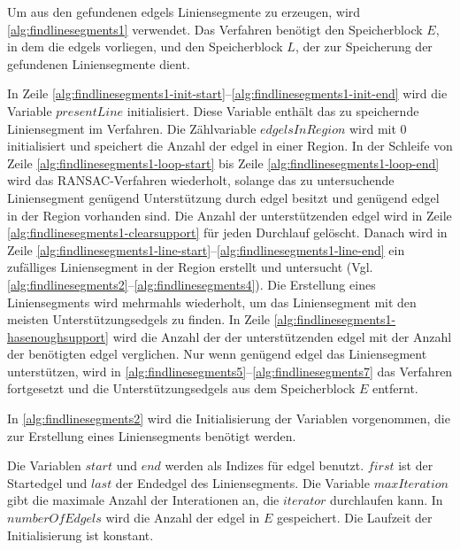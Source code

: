Um aus den gefundenen \glspl{edgel} Liniensegmente zu erzeugen, wird \autoref{alg:findlinesegments1} verwendet. Das
 Verfahren benötigt den Speicherblock $E$, in dem die \glspl{edgel} vorliegen, und den Speicherblock $L$, der zur
 Speicherung der gefundenen Liniensegmente dient.

In Zeile \ref{alg:findlinesegments1-init-start}--\ref{alg:findlinesegments1-init-end} wird die Variable
 $\mathit{presentLine}$ initialisiert. Diese Variable enthält das zu speichernde Liniensegment im Verfahren.
 Die Zählvariable $\mathit{edgelsInRegion}$ wird mit $0$ initialisiert und speichert die Anzahl der \gls{edgel} in
 einer Region. In der Schleife von Zeile \ref{alg:findlinesegments1-loop-start} bis Zeile
 \ref{alg:findlinesegments1-loop-end} wird das RANSAC-Verfahren wiederholt, solange das zu untersuchende Liniensegment
 genügend Unterstützung durch \gls{edgel} besitzt und genügend \gls{edgel} in der Region vorhanden sind. Die Anzahl der
 unterstützenden \gls{edgel} wird in Zeile \ref{alg:findlinesegments1-clearsupport} für jeden Durchlauf gelöscht.
 Danach wird in Zeile \ref{alg:findlinesegments1-line-start}--\ref{alg:findlinesegments1-line-end} ein zufälliges
 Liniensegment in der Region erstellt und untersucht
 (Vgl. \autoref{alg:findlinesegments2}--\autoref{alg:findlinesegments4}). Die Erstellung eines Liniensegments wird
 mehrmahls wiederholt, um das Liniensegment mit den meisten Unterstützungsedgels zu finden. In Zeile
 \ref{alg:findlinesegments1-hasenoughsupport} wird die Anzahl der der unterstützenden \gls{edgel} mit der Anzahl der
 benötigten \gls{edgel} verglichen. Nur wenn genügend \gls{edgel} das Liniensegment unterstützen, wird in
 \autoref{alg:findlinesegments5}--\autoref{alg:findlinesegments7} das Verfahren fortgesetzt und die
 Unterstützungsedgels aus dem Speicherblock $E$ entfernt.

In \autoref{alg:findlinesegments2} wird die Initialisierung der Variablen vorgenommen, die zur Erstellung eines
 Liniensegments benötigt werden.

Die Variablen $\mathit{start}$ und $\mathit{end}$ werden als Indizes für \gls{edgel} benutzt. $\mathit{first}$ ist der
 Startedgel und $\mathit{last}$ der Endedgel des Liniensegments. Die Variable $\mathit{maxIteration}$ gibt die maximale
 Anzahl der Interationen an, die $\mathit{iterator}$ durchlaufen kann. In $\mathit{numberOfEdgels}$ wird die Anzahl der
 \gls{edgel} in $E$ gespeichert. Die Laufzeit der Initialisierung ist konstant.

